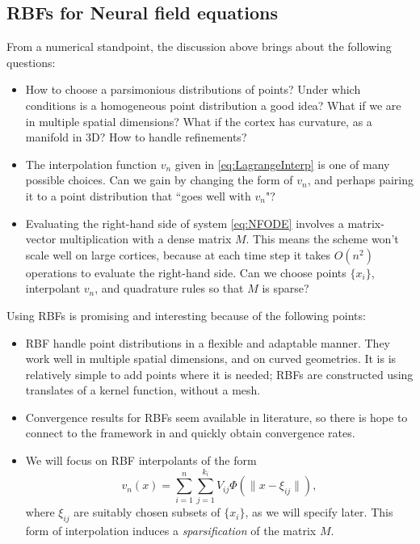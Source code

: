 \documentclass[a4paper]{siamart190516}
\begin{document}
\subsection{RBFs for Neural field equations}\label{ssec:RBFMotivation} From a
numerical standpoint, the discussion above brings about the following questions:
  \begin{itemize}
    \item How to choose a parsimonious distributions of points? Under which conditions
      is a homogeneous point distribution a good idea? What if we are in multiple
      spatial dimensions? What if the cortex has curvature, as a manifold in 3D? How
      to handle refinements?
    \item The interpolation function $v_n$ given in \cref{eq:LagrangeInterp} is one
      of many possible choices. Can we gain by changing the form of $v_n$, and
      perhaps pairing it to a point distribution that ``goes well with $v_n$"?
    \item Evaluating the right-hand side of system \cref{eq:NFODE} involves a
      matrix-vector multiplication with a dense matrix $M$. This means the scheme
      won't scale well on large cortices, because at each time step it takes
      $O(n^2)$ operations to evaluate the right-hand side. Can we choose points $\{
      x_i \}$, interpolant $v_n$, and quadrature rules so that $M$ is sparse?
  \end{itemize}

  Using RBFs is promising and interesting because of the following points:
  \begin{itemize}
      \item RBF handle point distributions in a flexible and adaptable manner. They
        work well in multiple spatial dimensions, and on curved geometries. It is is
        relatively simple to add points where it is needed; RBFs are constructed
        using translates of a kernel function, without a mesh.
      \item Convergence results for RBFs seem available in literature, so there is
        hope to connect to the framework in
        \cite {Avitabile:2023ab} and quickly obtain convergence
        rates.
      \item We will focus on RBF interpolants of the form
        \begin{equation}\label{eq:RBFInterpolation}
          v_n(x) = \sum_{i=1}^{n} \sum_{j=1}^{k_i} V_{ij} \Phi(\| x - \xi_{ij} \|),
        \end{equation}
        where $\xi_{ij}$ are suitably chosen subsets of $\{ x_i \}$, as we will
        specify later. This form of interpolation induces a \textit{sparsification}
        of the matrix $M$.
  \end{itemize}
    
\end{document}
